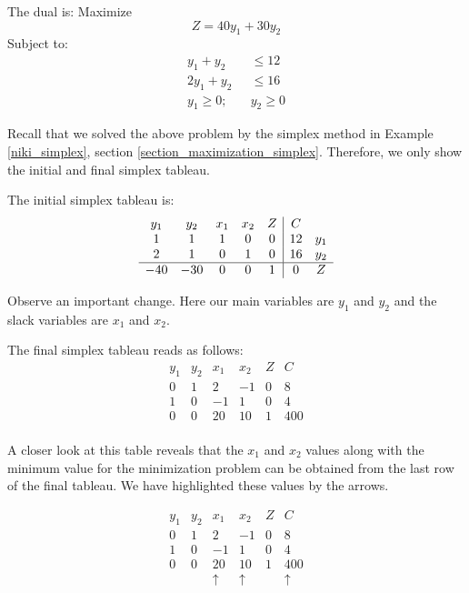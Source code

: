 \begin{solution}
    The dual is:
    Maximize
    \[ Z = 40y_1 + 30y_2 \]
    Subject to:
    \begin{align*}
        y_1 + y_2         & \leq 12    \\
        2y_1 + y_2        & \leq 16    \\
        y_1 \geq 0; \quad & y_2 \geq 0
    \end{align*}

    Recall that we solved the above problem by the simplex method in Example \ref{niki_simplex}, section \ref{section_maximization_simplex}. Therefore, we only show the initial and final simplex tableau.

    The initial simplex tableau is:
    \[
        \begin{array}{c c c c c | c c}

            y_1 & y_2 & x_1 & x_2 & Z & C  &     \\

            1   & 1   & 1   & 0   & 0 & 12 & y_1 \\
            2   & 1   & 0   & 1   & 0 & 16 & y_2 \\
            \hline
            -40 & -30 & 0   & 0   & 1 & 0  & Z   \\
        \end{array}
    \]

    Observe an important change. Here our main variables are \(y_1\) and \(y_2\) and the slack variables are \(x_1\) and \(x_2\).

    The final simplex tableau reads as follows:
    \[
        \begin{array}{ccccc|c}
            y_1 & y_2 & x_1 & x_2 & Z & C   \\
            0   & 1   & 2   & -1  & 0 & 8   \\
            1   & 0   & -1  & 1   & 0 & 4   \\
            \hline
            0   & 0   & 20  & 10  & 1 & 400 \\
        \end{array}
    \]

    A closer look at this table reveals that the \(x_1\) and \(x_2\) values along with the minimum value for the minimization problem can be obtained from the last row of the final tableau. We have highlighted these values by the arrows.

    \[
        \begin{array}{ccccc|c}
            y_1 & y_2 & x_1      & x_2      & Z & C        \\
            0   & 1   & 2        & -1       & 0 & 8        \\
            1   & 0   & -1       & 1        & 0 & 4        \\
            \hline
            0   & 0   & 20       & 10       & 1 & 400      \\
                &     & \uparrow & \uparrow &   & \uparrow \\
        \end{array}
    \]
\end{solution}

